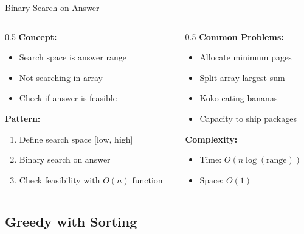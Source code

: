 \documentclass[aspectratio=169,xcolor=dvipsnames]{beamer}
\begin{document}
\begin{frame}{Binary Search on Answer}
  \begin{columns}
    \begin{column}{0.5\textwidth}
      \textbf{Concept:}
      \begin{itemize}
        \item Search space is answer range
        \item Not searching in array
        \item Check if answer is feasible
      \end{itemize}

      \vspace{0.3cm}
      \textbf{Pattern:}
      \begin{enumerate}
        \item Define search space [low, high]
        \item Binary search on answer
        \item Check feasibility with $O(n)$ function
      \end{enumerate}
    \end{column}

    \begin{column}{0.5\textwidth}
      \textbf{Common Problems:}
      \begin{itemize}
        \item Allocate minimum pages
        \item Split array largest sum
        \item Koko eating bananas
        \item Capacity to ship packages
      \end{itemize}

      \vspace{0.3cm}
      \textbf{Complexity:}
      \begin{itemize}
        \item Time: $O(n \log(\text{range}))$
        \item Space: $O(1)$
      \end{itemize}
    \end{column}
  \end{columns}
\end{frame}

\subsection{Greedy with Sorting}
\end{document}

